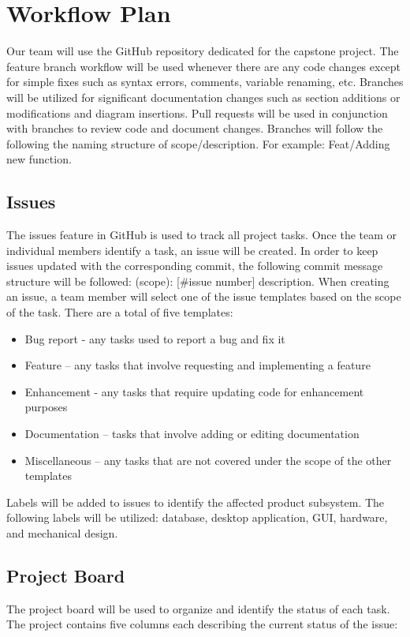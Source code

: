 \documentclass{article}
\begin{document}
\section{Workflow Plan}
Our team will use the GitHub repository dedicated for the capstone project. The feature
branch workflow will be used whenever there are any code changes except for simple fixes such as syntax errors, comments, variable renaming, etc. 
Branches will be utilized for significant documentation changes such as section additions or modifications and diagram insertions. 
Pull requests will be used in conjunction with branches to review code and document changes.
Branches will follow the following the naming structure of scope/description. For example: Feat/Adding new function.

\subsection{Issues}
The issues feature in GitHub is used to track all project tasks. Once the team or individual members identify a task, an issue will be created. In order to keep issues updated with the corresponding commit, the following commit message structure will be followed: (scope): [\#issue number] description. When creating an issue, a team member will select one of the issue templates based on the scope of the task. There are a total of five templates: 

\begin{itemize}
	\item Bug report - any tasks used to report a bug and fix it
	\item Feature – any tasks that involve requesting and implementing a feature
	\item Enhancement - any tasks that require updating code for enhancement purposes
	\item Documentation – tasks that involve adding or editing documentation
	\item Miscellaneous – any tasks that are not covered under the scope of the other templates
\end{itemize}

\noindent
Labels will be added to issues to identify the affected product subsystem. The following labels will be utilized: 
database, desktop application, GUI, hardware, and mechanical design.

\subsection{Project Board}
The project board will be used to organize and identify the status of each task. 
The project contains five columns each describing the current status of the issue:
\end{document}
